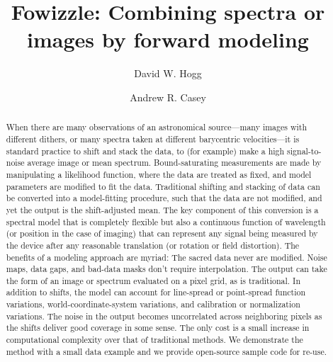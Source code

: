 \documentclass[modern]{aastex631}
\begin{document}
\title{\large Fowizzle: Combining spectra or images by forward modeling}

\author[0000-0003-2866-9403]{David W. Hogg}

\author[0000-0003-0174-0564]{Andrew R. Casey}

\begin{abstract}\noindent
When there are many observations of an astronomical source---many images with different dithers, or many spectra taken at different barycentric velocities---it is standard practice to shift and stack the data, to (for example) make a high signal-to-noise average image or mean spectrum.
Bound-saturating measurements are made by manipulating a likelihood function, where the data are treated as fixed, and model parameters are modified to fit the data.
Traditional shifting and stacking of data can be converted into a model-fitting procedure, such that the data are not modified, and yet the output is the shift-adjusted mean.
The key component of this conversion is a spectral model that is completely flexible but also a continuous function of wavelength (or position in the case of imaging) that can represent any signal being measured by the device after any reasonable translation (or rotation or field distortion).
The benefits of a modeling approach are myriad:
The sacred data never are modified.
Noise maps, data gaps, and bad-data masks don't require interpolation.
The output can take the form of an image or spectrum evaluated on a pixel grid, as is traditional.
In addition to shifts, the model can account for line-spread or point-spread function variations, world-coordinate-system variations, and calibration or normalization variations.
The noise in the output becomes uncorrelated across neighboring pixels as the shifts deliver good coverage in some sense.
The only cost is a small increase in computational complexity over that of traditional methods.
We demonstrate the method with a small data example and we provide open-source sample code for re-use.
\end{abstract}


\section*{}\clearpage
\end{document}
